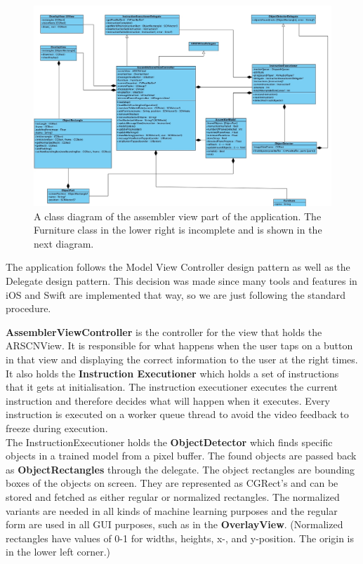 \begin{figure}[!hbtp]
\begin{center}
\includegraphics[width = 1.1\textwidth]{./Images/AssemblerClassDiagram1.jpg}
\caption{A class diagram of the assembler view part of the application. The Furniture class in the lower right is incomplete and is shown in the next diagram.}
\label{fig:classdiagramassembler}
\end{center}
\end{figure}

The application follows the Model View Controller design pattern as well as the Delegate design pattern.
This decision was made since many tools and features in iOS and Swift are implemented that way,
so we are just following the standard procedure.

\textbf{AssemblerViewController} is the controller for the view that holds the ARSCNView.
It is responsible for what happens when the user taps on a button in that view and displaying the correct
information to the user at the right times. It also holds the \textbf{Instruction Executioner} which holds a 
set of instructions that it gets at initialisation. The instruction executioner executes the current
instruction and therefore decides what will happen when it executes. Every instruction is executed on a worker queue thread to avoid the video feedback to freeze during execution.\\

The InstructionExecutioner holds the \textbf{ObjectDetector} which finds specific objects in a 
trained model from a pixel buffer. The found objects are passed back as \textbf{ObjectRectangles} through the delegate. The object rectangles are bounding boxes
of the objects on screen. They are represented as CGRect's and can be stored and fetched as
either regular or normalized rectangles. The normalized variants are needed in all kinds of machine learning purposes and the regular form are used in all GUI purposes, such as in the \textbf{OverlayView}. (Normalized 
rectangles have values of 0-1 for widths, heights, x-, and y-position. The origin is in the lower left 
corner.)\\

